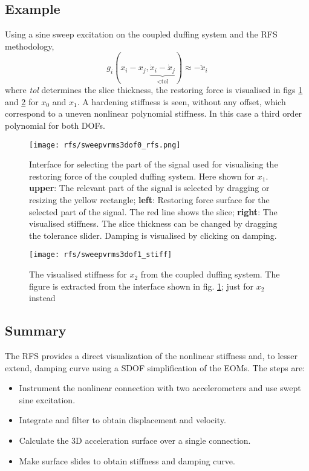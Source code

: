 \subsection{Example}
\label{sec:rfs_example}

Using a sine sweep excitation on the coupled duffing system and the RFS
methodology,
\begin{equation}
  \label{eq:rfs_tol}
  g_i (x_i - x_j , \underbrace{\dot x_i - \dot x_j}_\text{<tol}) \approx - \ddot x_i
\end{equation}
where \textit{tol} determines the slice thickness, the restoring force is
visualised in figs \ref{fig:rfs_full} and \ref{fig:rfs_stiff} for $x_0$ and
$x_1$. A hardening stiffness is seen, without any offset, which correspond to a
uneven nonlinear polynomial stiffness. In this case a third order polynomial for
both DOFs.

\begin{figure}[!ht]
  \centering
  \texttt{[image: rfs/sweepvrms3dof0\_rfs.png]}
  \caption{Interface for selecting the part of the signal used for
    visualising the restoring force of the coupled duffing system. Here shown
    for $x_1$.
    \textbf{upper}: The relevant part of the signal is selected by dragging or
    resizing the yellow rectangle;
    \textbf{left}: Restoring force surface for the selected part of the signal.
    The red line shows the slice;
    \textbf{right}: The visualised stiffness. The slice thickness can be changed
    by dragging the tolerance slider. Damping is visualised by clicking on
    damping.
  }
  \label{fig:rfs_full}
\end{figure}


\begin{figure}[!ht]
  \centering
  \texttt{[image: rfs/sweepvrms3dof1\_stiff]}
  \caption{The visualised stiffness for $x_2$ from the coupled duffing system.
    The figure is extracted from the interface shown in fig. \ref{fig:rfs_full};
    just for $x_2$ instead}
  \label{fig:rfs_stiff}
\end{figure}

\subsection{Summary}
\label{sec:rfs_summary}

The RFS provides a direct visualization of the nonlinear stiffness and, to
lesser extend, damping curve using a SDOF simplification of the EOMs. The steps
are:
\begin{itemize}
\item Instrument the nonlinear connection with two accelerometers and use swept
  sine excitation.
\item Integrate and filter to obtain displacement and velocity.
\item Calculate the 3D acceleration surface over a single connection.
\item Make surface slides to obtain stiffness and damping curve.
\end{itemize}

